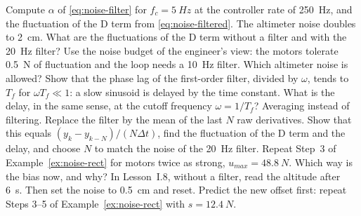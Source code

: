 \begin{exercises}
\exercise[1] Compute $\alpha$ of \cref{eq:noise-filter} for $f_c = \SI{5}{Hz}$ at the controller rate of \SI{250}{Hz}, and the fluctuation of the D term from \cref{eq:noise-filtered}.
\exercise[1] The altimeter noise doubles to \SI{2}{cm}. What are the fluctuations of the D term without a filter and with the \SI{20}{Hz} filter?
\exercise[1] Use the noise budget of the engineer's view: the motors tolerate \SI{0.5}{N} of fluctuation and the loop needs a \SI{10}{Hz} filter. Which altimeter noise is allowed?
\exercise[2] Show that the phase lag of the first-order filter, divided by $\omega$, tends to $T_f$ for $\omega T_f \ll 1$: a slow sinusoid is delayed by the time constant. What is the delay, in the same sense, at the cutoff frequency $\omega = 1/T_f$?
\exercise[2] Averaging instead of filtering. Replace the filter by the mean of the last $N$ raw derivatives. Show that this equals $(y_k - y_{k-N})/(N\Delta t)$, find the fluctuation of the D term and the delay, and choose $N$ to match the noise of the \SI{20}{Hz} filter.
\exercise[2] Repeat Step~3 of Example~\ref{ex:noise-rect} for motors twice as strong, $u_{max} = \SI{48.8}{N}$. Which way is the bias now, and why?
\exercise[2] In Lesson~I.8, without a filter, read the altitude after \SI{6}{s}. Then set the noise to \SI{0.5}{cm} and reset. Predict the new offset first: repeat Steps 3–5 of Example~\ref{ex:noise-rect} with $s = \SI{12.4}{N}$.

\end{exercises}
